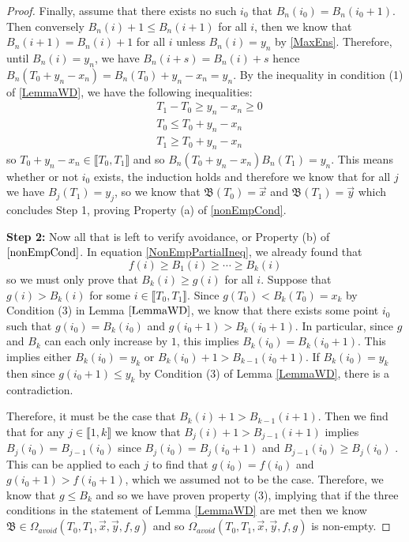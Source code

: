 \begin{proof}
		Finally, assume that there exists no such $i_0$ that $B_n(i_0)=B_n(i_0+1)$. Then conversely $B_{n}(i)+1\leq B_{n}(i+1)$ for all $i$, then we know that $B_{n}(i+1)=B_{n}(i)+1$ for all $i$ unless $B_{n}(i)=y_{n}$ by \ref{MaxEns}. Therefore, until $B_{n}(i)=y_{n}$, we have $B_{n}(i+s)=B_{n}(i)+s$ hence $B_{n}(T_0+y_{n}-x_{n})=B_{n}(T_0)+y_{n}-x_{n}=y_{n}$. By the inequality in condition (1) of \ref{LemmaWD}, we have the following inequalities:
		\begin{equation}\begin{split}
		&T_1-T_0\geq y_{n}-x_{n}\geq 0 \\
		&T_0\leq T_0+y_{n}-x_{n}\\
		&T_1\geq T_0+y_{n}-x_{n}\end{split}\end{equation} so $T_0+y_{n}-x_{n}\in \llbracket T_0,T_1\rrbracket$ and so $B_n(T_0+y_{n}-x_n)B_{n}(T_1)=y_{n}$. This means whether or not $i_0$ exists, the induction holds and therefore we know that for all $j$ we have $B_j(T_1)=y_j$, so we know that $\mathfrak{B}(T_0)=\vec x$ and $\mathfrak{B}(T_1)=\vec y$ which concludes Step 1, proving Property (a) of \ref{nonEmpCond}.
		
		\textbf{Step 2:} Now all that is left to verify avoidance, or Property (b) of $\ref{nonEmpCond}$. In equation \ref{NonEmpPartialIneq}, we already found that 
		\begin{equation*}
		f(i)\geq B_1(i)\geq \cdots \geq B_k(i)
		\end{equation*} so we must only prove that $B_{k}(i)\geq g(i)$ for all $i$. Suppose that $g(i)>B_k(i)$ for some $i\in \llbracket T_0,T_1\rrbracket$. Since $g(T_0)<B_k(T_0)=x_k$ by Condition (3) in Lemma $\ref{LemmaWD}$, we know that there exists some point $i_0$ such that $g(i_0)=B_k(i_0)$ and $g(i_0+1)>B_k(i_0+1)$. In particular, since $g$ and $B_k$ can each only increase by $1$, this implies $B_k(i_0)=B_k(i_0+1)$. This implies either $B_k(i_0)=y_k$ or $B_k(i_0)+1>B_{k-1}(i_0+1)$. If $B_k(i_0)=y_k$ then since $g(i_0+1)\leq y_k$ by Condition (3) of Lemma \ref{LemmaWD}, there is a contradiction. 
		
		Therefore, it must be the case that $B_k(i)+1>B_{k-1}(i+1)$. Then we find that for any $j\in \llbracket 1,k\rrbracket$ we know that $B_j(i)+1>B_{j-1}(i+1)$ implies $B_j(i_0)=B_{j-1}(i_0)$ since $B_j(i_0)=B_j(i_0+1)$ and $B_{j-1}(i_0)\geq B_j(i_0)$ . This can be applied to each $j$ to find that $g(i_0)=f(i_0)$ and $g(i_0+1)>f(i_0+1)$, which we assumed not to be the case. Therefore, we know that $g\leq B_k$ and so we have proven property (3), implying that if the three conditions in the statement of Lemma \ref{LemmaWD} are met then we know $\mathfrak{B}\in \Omega_{avoid}(T_0,T_1,\vec x,\vec y, f,g)$ and so $\Omega_{avoid}(T_0,T_1,\vec x,\vec y, f,g)$ is non-empty.
	\end{proof}


